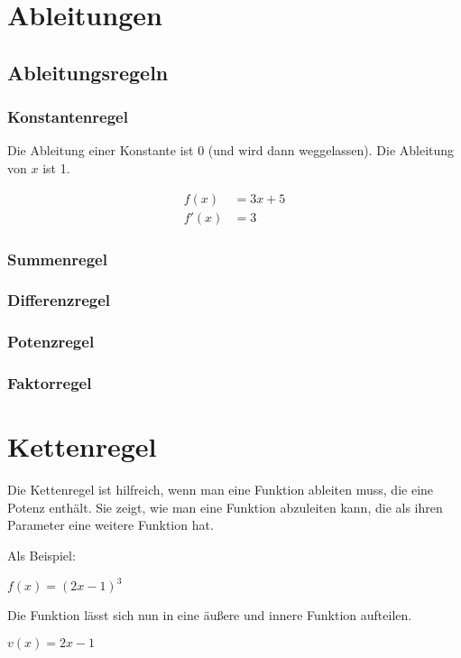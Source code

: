 \section{Ableitungen}

\subsection{Ableitungsregeln}

\subsubsection{Konstantenregel}

Die Ableitung einer Konstante ist 0 (und wird dann weggelassen).
Die Ableitung von $x$ ist 1.

\vspace*{-1.3cm}
\begin{align*}
    f(x) & = 3x + 5 \\
    f'(x) & = 3
\end{align*}

\subsubsection{Summenregel}
\subsubsection{Differenzregel}
\subsubsection{Potenzregel}
\subsubsection{Faktorregel}

\section*{Kettenregel}

Die Kettenregel ist hilfreich, wenn man eine Funktion ableiten muss, die eine Potenz enthält.
Sie zeigt, wie man eine Funktion abzuleiten kann, die als ihren Parameter eine weitere Funktion hat.

Als Beispiel:

$f(x) = (2x - 1)^3$

Die Funktion lässt sich nun in eine äußere und innere Funktion aufteilen.

$v(x) = 2x - 1$


